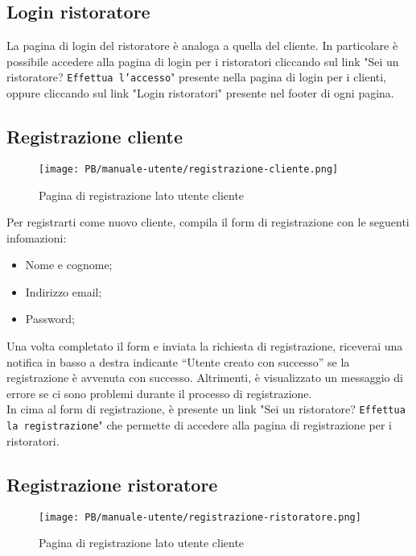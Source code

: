 \subsection{Login ristoratore}

La pagina di login del ristoratore è analoga a quella del cliente. In
particolare è possibile accedere alla pagina di login per i ristoratori 
cliccando sul link "Sei un ristoratore? \texttt{Effettua l'accesso}" presente 
nella pagina di login per i clienti, oppure cliccando sul link 
"Login ristoratori" presente nel footer di ogni pagina.

\subsection{Registrazione cliente}

\begin{figure}[htbp]
    \centering
	\texttt{[image: PB/manuale-utente/registrazione-cliente.png]}
    \caption{Pagina di registrazione lato utente cliente}
\end{figure}

Per registrarti come nuovo cliente, compila il form di registrazione con le
seguenti infomazioni:

\begin{itemize}
	\item Nome e cognome;
	\item Indirizzo email;
	\item Password;
\end{itemize}

Una volta completato il form e inviata la richiesta di registrazione, riceverai 
una notifica in basso a destra indicante 
``Utente creato con successo'' se la registrazione è avvenuta con successo.
Altrimenti, è visualizzato un messaggio di errore se ci sono problemi durante il
processo di registrazione.\\
In cima al form di registrazione, è presente un link "Sei un ristoratore?
\texttt{Effettua la registrazione}" che permette di accedere alla pagina di
registrazione per i ristoratori.

\subsection{Registrazione ristoratore}

\begin{figure}[htbp]
    \centering
	\texttt{[image: PB/manuale-utente/registrazione-ristoratore.png]}
    \caption{Pagina di registrazione lato utente cliente}
\end{figure}

